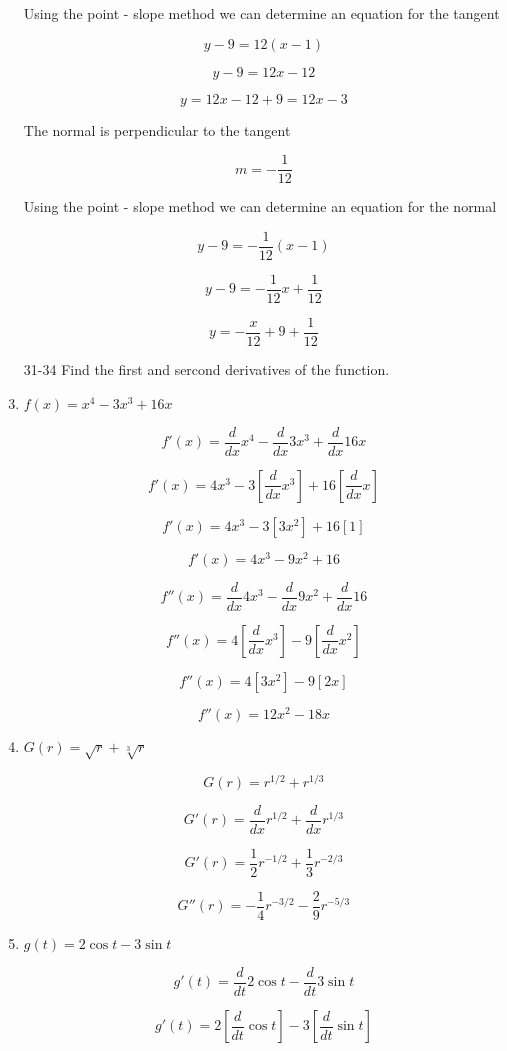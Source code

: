 \documentclass{article}
\begin{document}
\begin{enumerate}
			Using the point - slope method we can determine an equation for the tangent

			$$y - 9 = 12(x -1)$$

			$$y - 9 = 12x - 12$$

			$$y = 12x - 12 + 9 = 12x - 3$$

			The normal is perpendicular to the tangent

			$$m = -\frac{1}{12}$$

			Using the point - slope method we can determine an equation for the normal

			$$y - 9 = -\frac{1}{12}(x - 1)$$

			$$y - 9 = -\frac{1}{12}x + \frac{1}{12}$$

			$$y = -\frac{x}{12} + 9 + \frac{1}{12}$$

		\item[31-34] Find the first and sercond derivatives of the function.

		\item $f(x) = x^4 - 3x^3 + 16x$

			$$f'(x) = \frac{d}{dx} x^4 - \frac{d}{dx} 3x^3 + \frac{d}{dx} 16x$$

			$$f'(x) = 4x^3 - 3[\frac{d}{dx} x^3] + 16 [\frac{d}{dx} x]$$

			$$f'(x) = 4x^3 - 3[3x^2] + 16[1]$$

			$$f'(x) = 4x^3 - 9x^2 + 16$$

			$$f''(x) = \frac{d}{dx} 4x^3 - \frac{d}{dx} 9x^2 + \frac{d}{dx} 16$$

			$$f''(x) = 4[\frac{d}{dx} x^3] - 9[\frac{d}{dx} x^2]$$

			$$f''(x) = 4[3x^2] - 9[2x]$$

			$$f''(x) = 12x^2 - 18x$$

		\item $G(r) = \sqrt{r} + \sqrt[3]{r}$

			$$G(r) = r^{1/2} + r^{1/3}$$

			$$G'(r) = \frac{d}{dx} r^{1/2} + \frac{d}{dx} r^{1/3}$$

			$$G'(r) = \frac{1}{2} r^{-1/2} + \frac{1}{3} r^{-2/3}$$

			$$G''(r) = - \frac{1}{4} r^{-3/2} - \frac{2}{9} r^{-5/3}$$

		\item $g(t) = 2\cos t - 3 \sin t$

			$$g'(t) = \frac{d}{dt} 2\cos t - \frac{d}{dt} 3 \sin t$$

			$$g'(t) = 2[\frac{d}{dt} \cos t] - 3 [\frac{d}{dt} \sin t]$$


\end{enumerate}
\end{document}
